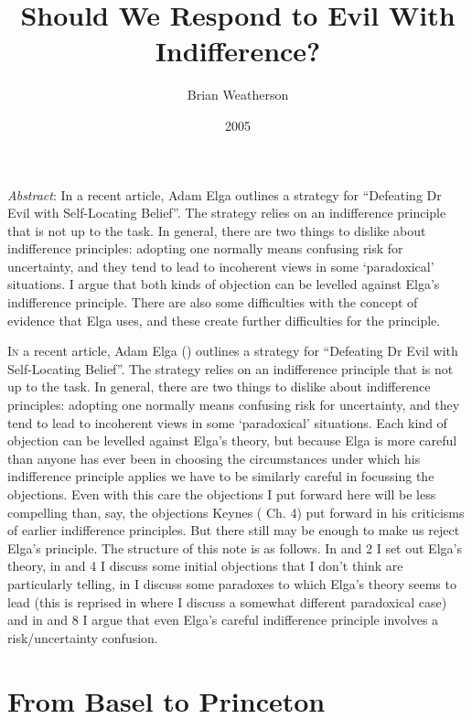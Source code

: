 \documentclass[
  11pt,
  letterpaper,
  DIV=11,
  numbers=noendperiod,
  twoside]{scrartcl}
\title{Should We Respond to Evil With Indifference?}
\author{Brian Weatherson}
\date{2005}
\renewenvironment{abstract}
 {\vspace{-1.25cm}
 \quotation\small\noindent\emph{Abstract}:}
 {\endquotation}
\renewenvironment{abstract}
 {\quotation\small\noindent\emph{Abstract}:}
 {\endquotation\vspace{-0.02cm}}
\begin{document}
\maketitle
\begin{abstract}
In a recent article, Adam Elga outlines a strategy for ``Defeating Dr
Evil with Self-Locating Belief''. The strategy relies on an indifference
principle that is not up to the task. In general, there are two things
to dislike about indifference principles: adopting one normally means
confusing risk for uncertainty, and they tend to lead to incoherent
views in some `paradoxical' situations. I argue that both kinds of
objection can be levelled against Elga's indifference principle. There
are also some difficulties with the concept of evidence that Elga uses,
and these create further difficulties for the principle.
\end{abstract}


\lettrine{I}{n} a recent article, Adam Elga
() outlines a strategy for ``Defeating Dr
Evil with Self-Locating Belief''. The strategy relies on an indifference
principle that is not up to the task. In general, there are two things
to dislike about indifference principles: adopting one normally means
confusing risk for uncertainty, and they tend to lead to incoherent
views in some `paradoxical' situations. Each kind of objection can be
levelled against Elga's theory, but because Elga is more careful than
anyone has ever been in choosing the circumstances under which his
indifference principle applies we have to be similarly careful in
focussing the objections. Even with this care the objections I put
forward here will be less compelling than, say, the objections Keynes
( Ch. 4) put forward in his criticisms of
earlier indifference principles. But there still may be enough to make
us reject Elga's principle. The structure of this note is as follows. In
and 2 I set out Elga's theory, in and 4 I discuss some initial
objections that I don't think are particularly telling, in I discuss
some paradoxes to which Elga's theory seems to lead (this is reprised in
where I discuss a somewhat different paradoxical case) and in and 8 I
argue that even Elga's careful indifference principle involves a
risk/uncertainty confusion.

\section{From Basel to Princeton}\label{sec-basel}
\end{document}
